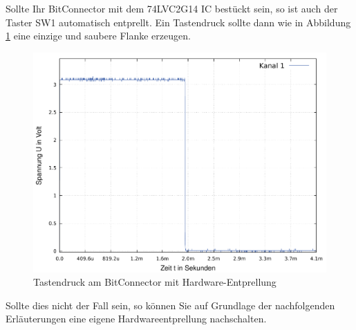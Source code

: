 \documentclass{article}
\begin{document}
\newpage

Sollte Ihr BitConnector mit dem 74LVC2G14 IC bestückt sein, so ist auch der Taster SW1 automatisch entprellt. Ein Tastendruck sollte dann wie in Abbildung \ref{fig:prellen_3} eine einzige und saubere Flanke erzeugen. 


\begin{figure}[!h]
	\centering
	\includegraphics[width=0.92\linewidth]{Figures/debounce}
	\caption{Tastendruck am BitConnector mit Hardware-Entprellung}
	\label{fig:prellen_3}
\end{figure}

Sollte dies nicht der Fall sein, so können Sie auf Grundlage der nachfolgenden Erläuterungen eine eigene Hardwareentprellung nachschalten.
\end{document}
